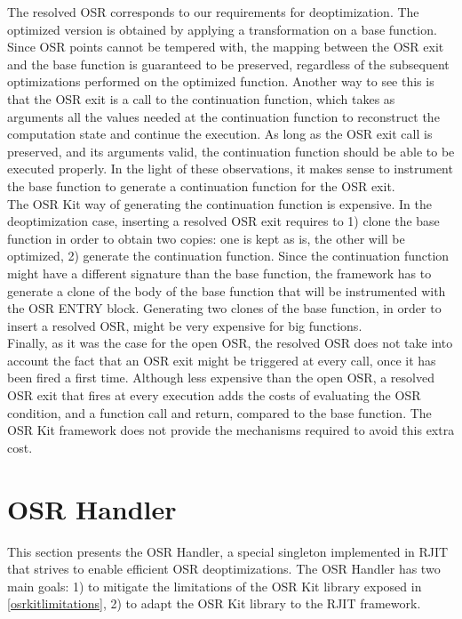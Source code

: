 The resolved OSR corresponds to our requirements for deoptimization.
The optimized version is obtained by applying a transformation on a base function.
Since OSR points cannot be tempered with, the mapping between the OSR exit and the base function is guaranteed to be preserved, regardless of the subsequent optimizations performed on the optimized function.
Another way to see this is that the OSR exit is a call to the continuation function, which takes as arguments all the values needed at the continuation function to reconstruct the computation state and continue the execution.
As long as the OSR exit call is preserved, and its arguments valid, the continuation function should be able to be executed properly.
In the light of these observations, it makes sense to instrument the base function to generate a continuation function for the OSR exit.\\

The OSR Kit way of generating the continuation function is expensive.
In the deoptimization case, inserting a resolved OSR exit requires to 1) clone the base function in order to obtain two copies: one is kept as is, the other will be optimized, 2) generate the continuation function. 
Since the continuation function might have a different signature than the base function, the framework has to generate a clone of the body of the base function that will be instrumented with the OSR ENTRY block.
Generating two clones of the base function, in order to insert a resolved OSR, might be very expensive for big functions.\\

Finally, as it was the case for the open OSR, the resolved OSR does not take into account the fact that an OSR exit might be triggered at every call, once it has been fired a first time.
Although less expensive than the open OSR, a resolved OSR exit that fires at every execution adds the costs of evaluating the OSR condition, and a function call and return, compared to the base function.
The OSR Kit framework does not provide the mechanisms required to avoid this extra cost.\\

\section{OSR Handler}
This section presents the OSR Handler, a special singleton implemented in RJIT that strives to enable efficient OSR deoptimizations. 
The OSR Handler has two main goals: 1) to mitigate the limitations of the OSR Kit\cite{OSRKit} library exposed in \ref{osrkitlimitations}, 2) to adapt the OSR Kit library to the RJIT framework.\\

